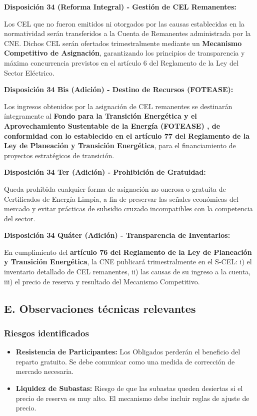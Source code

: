 \documentclass{cel}
\begin{document}
\textbf{Disposición 34 (Reforma Integral) - Gestión de CEL Remanentes:}

\textquotedbl{}Los CEL que no fueron emitidos ni otorgados por las causas establecidas en la normatividad serán transferidos a la Cuenta de Remanentes administrada por la CNE. Dichos CEL serán ofertados trimestralmente mediante un \textbf{Mecanismo Competitivo de Asignación}, garantizando los principios de transparencia y máxima concurrencia previstos en el artículo 6 del Reglamento de la Ley del Sector Eléctrico.\textquotedbl{}


\textbf{Disposición 34 Bis (Adición) - Destino de Recursos (FOTEASE):}

\textquotedbl{}Los ingresos obtenidos por la asignación de CEL remanentes se destinarán íntegramente al \textbf{Fondo para la Transición Energética y el Aprovechamiento Sustentable de la Energía (FOTEASE) \textbf{, de conformidad con lo establecido en el }artículo 77 del Reglamento de la Ley de Planeación y Transición Energética}, para el financiamiento de proyectos estratégicos de transición.\textquotedbl{}


\textbf{Disposición 34 Ter (Adición) - Prohibición de Gratuidad:}

\textquotedbl{}Queda prohibida cualquier forma de asignación no onerosa o gratuita de Certificados de Energía Limpia, a fin de preservar las señales económicas del mercado y evitar prácticas de subsidio cruzado incompatibles con la competencia del sector.\textquotedbl{}


\textbf{Disposición 34 Quáter (Adición) - Transparencia de Inventarios:}

\textquotedbl{}En cumplimiento del \textbf{artículo 76 del Reglamento de la Ley de Planeación y Transición Energética}, la CNE publicará trimestralmente en el S-CEL: i) el inventario detallado de CEL remanentes, ii) las causas de su ingreso a la cuenta, iii) el precio de reserva y resultado del Mecanismo Competitivo.\textquotedbl{}


\subsection{E. Observaciones técnicas relevantes}
\nopagebreak

\subsubsection{Riesgos identificados}
\nopagebreak

\begin{itemize}
\item \textbf{Resistencia de Participantes:} Los Obligados perderán el beneficio del \textquotedbl{}reparto gratuito\textquotedbl{}. Se debe comunicar como una medida de corrección de mercado necesaria.
\item \textbf{Liquidez de Subastas:} Riesgo de que las subastas queden desiertas si el precio de reserva es muy alto. El mecanismo debe incluir reglas de ajuste de precio.

\end{itemize}
\end{document}
